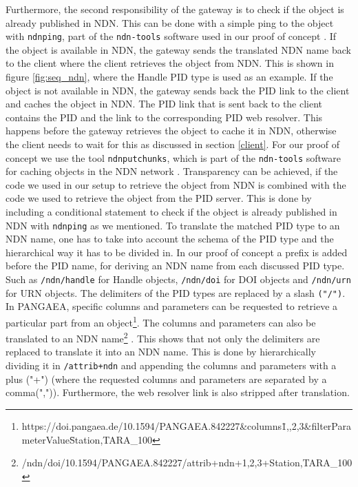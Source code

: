 Furthermore, the second responsibility of the gateway is to check if the object is already published in NDN.  This can be done with a simple ping to the object with \texttt{ndnping}, part of the \texttt{ndn-tools} software used in our proof of concept \cite{ndn-tools}. 
If the object is available in NDN, the gateway sends the translated NDN name back to the client where the client retrieves the object from NDN. This is shown in figure \ref{fig:seq_ndn}, where the Handle PID type is used as an example. If the object is not available in NDN, the gateway sends back the PID link to the client and caches the object in NDN. 
The PID link that is sent back to the client contains the PID and the link to the corresponding PID web resolver. This happens before the gateway retrieves the object to cache it in NDN, otherwise the client needs to wait for this as discussed in section \ref{client}. For our proof of concept we use the tool \texttt{ndnputchunks}, which is part of the \texttt{ndn-tools} software for caching objects in the NDN network \cite{ndn-tools}. Transparency can be achieved, if the code we used in our setup to retrieve the object from NDN is combined with the code we used to retrieve the object from the PID server. This is done by including a conditional statement to check if the object is already published in NDN with \texttt{ndnping} as we mentioned. 
To translate the matched PID type to an NDN name, one has to take into account the schema of the PID type and the hierarchical way it has to be divided in. In our proof of concept a prefix is added before the PID name, for deriving an NDN name from each discussed PID type. Such as \texttt{/ndn/handle} for Handle objects, \texttt{/ndn/doi} for DOI objects and \texttt{/ndn/urn} for URN objects. The delimiters of the PID types are replaced by a slash \texttt{("/")}. In PANGAEA, specific columns and parameters can be requested to retrieve a particular part from an object\footnote{https://doi.pangaea.de/10.1594/PANGAEA.842227\&columns\=1,,2,3\&filterParameterValue\=Station,TARA\_100}. The columns and parameters can also be translated to an NDN name\footnote{/ndn/doi/10.1594/PANGAEA.842227/attrib+ndn+1,2,3+Station,TARA\_100} \cite{ndn-app-aware}. This shows that not only the delimiters are replaced to translate it into an NDN name. This is done by hierarchically dividing it in \texttt{/attrib+ndn} and appending the columns and parameters with a plus ("+") (where the requested columns and parameters are separated by a comma(",")). Furthermore, the web resolver link is also stripped after translation.

